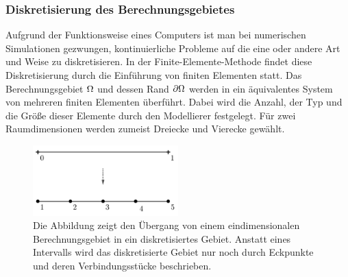 \documentclass[crop=false]{standalone}
\begin{document}

      \subsubsection{Diskretisierung des Berechnungsgebietes}
        Aufgrund der Funktionsweise eines Computers ist man bei numerischen Simulationen gezwungen, kontinuierliche Probleme auf die eine oder andere Art und Weise zu diskretisieren.
        In der Finite-Elemente-Methode findet diese Diskretisierung durch die Einführung von finiten Elementen statt.
        Das Berechnungsgebiet $\Omega$ und dessen Rand $\partial\Omega$ werden in ein äquivalentes System von mehreren finiten Elementen überführt.
        Dabei wird die Anzahl, der Typ und die Größe dieser Elemente durch den Modellierer festgelegt.
        Für zwei Raumdimensionen werden zumeist Dreiecke und Vierecke gewählt.
        \begin{figure}[h]
          \center
          \includegraphics[width=0.5\textwidth]{images/domain_one_dimension_example.pdf}
          \caption[Diskretisierung eines eindimensionalen Berechnungsgebietes]{%
            Die Abbildung zeigt den Übergang von einem eindimensionalen Berechnungsgebiet in ein diskretisiertes Gebiet.
            Anstatt eines Intervalls wird das diskretisierte Gebiet nur noch durch Eckpunkte und deren Verbindungsstücke beschrieben.
          }
          \label{fig:domain-example}
        \end{figure}
\end{document}
